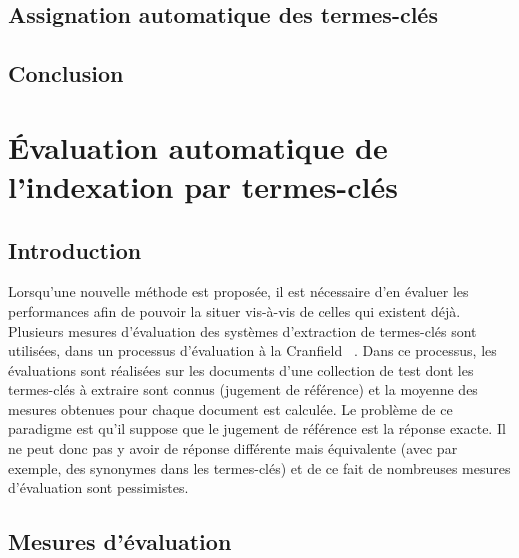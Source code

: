     \section{Assignation automatique des termes-clés}
    \label{sec:main-state_of_the_art-automatic_keyphrase_extraction-automatic_keyphrase_assignment}

    \section{Conclusion}
    \label{sec:main-state_of_the_art-automatic_keyphrase_extraction-conclusion}


    \chapter{Évaluation automatique de l'indexation par termes-clés}
  \label{chap:main-state_of_the_art-automatic_evaluation_of_keyphrase_annotation}
    \section{Introduction}
    \label{sec:main-state_of_the_art-automatic_evaluation_of_keyphrase_annotation-introduction}
      Lorsqu'une nouvelle méthode est proposée, il est nécessaire d'en évaluer
      les performances afin de pouvoir la situer vis-à-vis de celles qui
      existent déjà. Plusieurs mesures d'évaluation des systèmes d'extraction de
      termes-clés sont utilisées, dans un processus d'évaluation \og à la
      Cranfield \fg \ \citep{voorhees2002philosophy}. Dans ce processus, les
      évaluations sont réalisées sur les documents d'une collection de test dont
      les termes-clés à extraire sont connus (jugement de référence) et la
      moyenne des mesures obtenues pour chaque document est calculée. Le
      problème de ce paradigme est qu'il suppose que le jugement de référence
      est la réponse exacte. Il ne peut donc pas y avoir de réponse différente
      mais équivalente (avec par exemple, des synonymes dans les termes-clés) et
      de ce fait de nombreuses mesures d'évaluation sont pessimistes.
      

    \section{Mesures d'évaluation}
    \label{sec:main-state_of_the_art-automatic_evaluation_of_keyphrase_annotation-evaluation_measures}

